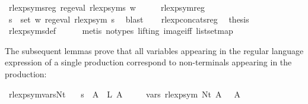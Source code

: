 \begin{isabellebody}
\endisatagproof
{\isafoldproof}%
%
\isadelimproof
\isanewline
%
\endisadelimproof
\isanewline
{}\isamarkupfalse%
\ rlexp{\isacharunderscore}{\kern0pt}syms{\isacharunderscore}{\kern0pt}reg{\isacharcolon}{\kern0pt}\ {\isachardoublequoteopen}reg{\isacharunderscore}{\kern0pt}eval\ {\isacharparenleft}{\kern0pt}rlexp{\isacharunderscore}{\kern0pt}syms\ w{\isacharparenright}{\kern0pt}{\isachardoublequoteclose}\isanewline
%
\isadelimproof
%
\endisadelimproof
%
\isatagproof
{}\isamarkupfalse%
\ {\isacharminus}{\kern0pt}\isanewline
\ \ \isamarkupfalse%
\ rlexp{\isacharunderscore}{\kern0pt}sym{\isacharunderscore}{\kern0pt}reg\ \isamarkupfalse%
\ {\isachardoublequoteopen}{\isasymforall}s\ {\isasymin}\ set\ w{\isachardot}{\kern0pt}\ reg{\isacharunderscore}{\kern0pt}eval\ {\isacharparenleft}{\kern0pt}rlexp{\isacharunderscore}{\kern0pt}sym\ s{\isacharparenright}{\kern0pt}{\isachardoublequoteclose}\ \isamarkupfalse%
\ blast\isanewline
\ \ \isamarkupfalse%
\ rlexp{\isacharunderscore}{\kern0pt}concats{\isacharunderscore}{\kern0pt}reg\ \isamarkupfalse%
\ {\isacharquery}{\kern0pt}thesis\ \isamarkupfalse%
\ rlexp{\isacharunderscore}{\kern0pt}syms{\isacharunderscore}{\kern0pt}def\isanewline
\ \ \ \ \isamarkupfalse%
\ {\isacharparenleft}{\kern0pt}metis\ {\isacharparenleft}{\kern0pt}no{\isacharunderscore}{\kern0pt}types{\isacharcomma}{\kern0pt}\ lifting{\isacharparenright}{\kern0pt}\ image{\isacharunderscore}{\kern0pt}iff\ list{\isachardot}{\kern0pt}set{\isacharunderscore}{\kern0pt}map{\isacharparenright}{\kern0pt}\isanewline
{}\isamarkupfalse%
%
\endisatagproof
{\isafoldproof}%
%
\isadelimproof
%
\endisadelimproof
%
\begin{isamarkuptext}%
The subsequent lemmas prove that all variables appearing in the regular language
expression of a single production correspond to non-terminals appearing in the production:%
\end{isamarkuptext}\isamarkuptrue%
\isamarkupfalse%
\ rlexp{\isacharunderscore}{\kern0pt}sym{\isacharunderscore}{\kern0pt}vars{\isacharunderscore}{\kern0pt}Nt{\isacharcolon}{\kern0pt}\isanewline
\ \ \ {\isachardoublequoteopen}s\ {\isacharparenleft}{\kern0pt}{\isasymgamma}{\isacharprime}{\kern0pt}\ A{\isacharparenright}{\kern0pt}\ {\isacharequal}{\kern0pt}\ L\ A{\isachardoublequoteclose}\isanewline
\ \ \ \ \ {\isachardoublequoteopen}vars\ {\isacharparenleft}{\kern0pt}rlexp{\isacharunderscore}{\kern0pt}sym\ {\isacharparenleft}{\kern0pt}Nt\ A{\isacharparenright}{\kern0pt}{\isacharparenright}{\kern0pt}\ {\isacharequal}{\kern0pt}\ {\isacharbraceleft}{\kern0pt}{\isasymgamma}{\isacharprime}{\kern0pt}\ A{\isacharbraceright}{\kern0pt}{\isachardoublequoteclose}\isanewline

\end{isabellebody}
